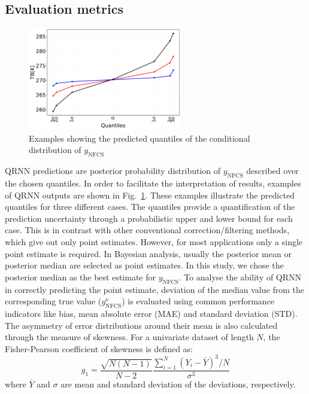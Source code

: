 \documentclass[amt, manuscript]{copernicus}
\newcommand{\ynfcs}{y_\text{NFCS}}
\newcommand{\yonfcs}{y^{o}_\text{NFCS}}
\begin{document}
\subsection{Evaluation metrics}
\label{sec:validation}
\begin{figure}[t]
	\centering
	\includegraphics[height=45mm]{Figures/posterior_distribution_I1V.pdf} 
	\caption{Examples showing the predicted quantiles of the conditional distribution of $\ynfcs$ }
	\label{fig:posterior_distribution_I1V}	
\end{figure}
QRNN predictions are posterior probability distribution of $\ynfcs$ described over the chosen quantiles. In order to facilitate the interpretation of results, examples of QRNN outputs are shown in Fig.~\ref{fig:posterior_distribution_I1V}. These examples illustrate the predicted quantiles for three different cases. The quantiles provide a quantification of the prediction uncertainty through a probabilistic upper and lower bound for each case. This is in contrast with other conventional correction/filtering methods, which give out only point estimates. However, for most applications only a single point estimate is required. In Bayesian analysis, usually the posterior mean or posterior median are selected as point estimates. In this study, we chose the posterior median as the best estimate for $\ynfcs$. To analyse the ability of QRNN in correctly predicting the point estimate, deviation of the median value from the corresponding true value ($\yonfcs$) is evaluated using common performance indicators like bias, mean absolute error (MAE) and standard deviation (STD). The asymmetry of error distributions around their mean is also calculated through the measure of skewness. For a univariate dataset of length $N$, the Fisher-Pearson coefficient of skewness is defined as: 
\begin{equation}
g_1 = 	\frac{\sqrt{N(N-1)}}{N-2} \frac{\sum_{i = 1}^{N}(Y_i - \bar{Y})^3/N}{\sigma^3}
\end{equation}
where $\bar{Y}$ and $\sigma$ are mean and standard deviation of the deviations, respectively.
\end{document}

